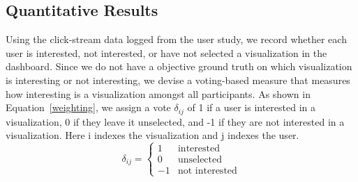 \subsection{Quantitative Results}
 Using the click-stream data logged from the user study, we record whether each user is interested, not interested, or have not selected a visualization in the dashboard. %
Since we do not have a objective ground truth on which visualization is interesting or not interesting, we devise a voting-based measure that measures how interesting is a visualization amongst all participants. As shown in Equation~\ref{weighting}, we assign a vote $\delta_{ij}$ of 1 if a user is interested in a visualization, 0 if they leave it unselected, and -1 if they are not interested in a visualization. Here i indexes the visualization and j indexes the user. 
\begin{equation}\label{weighting}
	\delta_{ij}= \left\{\begin{matrix}
	 1& \textrm{interested}
	\\ 0 & \textrm{unselected}
	\\ -1 & \textrm{not interested}
	\end{matrix}\right.
\end{equation}

